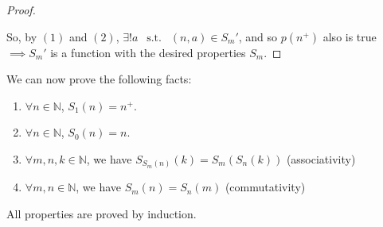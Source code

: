 \documentclass[12pt]{amsart}
\newcommand{\bbN}{\mathbb{N}}
\newcommand{\suchthat}{\operatorname{\enspace s.t. \enspace}}
\theoremstyle{plain}
\theoremstyle{remark}
\theoremstyle{definition}
\begin{document}
\begin{proof}
\begin{enumerate}[(1)]
	\end{enumerate}
	\par	
	So, by $(1)$ and $(2)$, $ \exists! a \suchthat (n, a) \in S_m'$, and so $p(n^+)$ also is true $\implies S_m'$ is a function with the desired properties $S_m$.
\end{proof}

\hfill
\par
We can now prove the following facts:
\begin{enumerate}[(1)]
	\item $\forall n \in \bbN$, $S_1(n) = n^+$.
	\item $\forall n \in \bbN$, $S_0(n) = n$.
	\item $\forall m, n, k \in \bbN$, we have $S_{S_m(n)}(k) = S_m\left( S_n(k) \right)$ (associativity)
	\item $\forall m, n \in \bbN$, we have $ S_m(n) = S_n(m)$ (commutativity)
\end{enumerate}
All properties are proved by induction.
\end{document}
